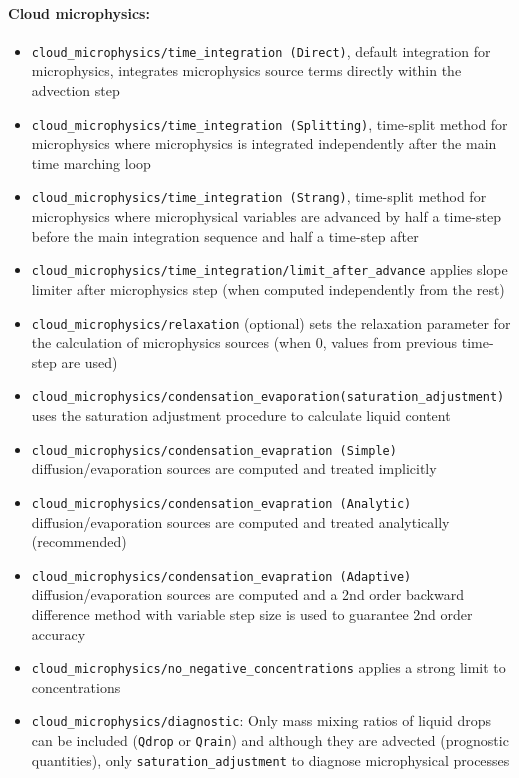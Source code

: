 \documentclass[10pt,a4paper]{article}
\begin{document}
\paragraph{Cloud microphysics:}
\begin{itemize}
\item \texttt{cloud\_microphysics/time\_integration (Direct)}, default integration for microphysics, integrates microphysics source terms directly within the advection step
\item \texttt{cloud\_microphysics/time\_integration (Splitting)}, time-split method for microphysics where microphysics is integrated independently after the main time marching loop
\item \texttt{cloud\_microphysics/time\_integration (Strang)}, time-split method for microphysics where microphysical variables are advanced by half a time-step before the main integration sequence and half a time-step after
\item \texttt{cloud\_microphysics/time\_integration/limit\_after\_advance} applies slope limiter after microphysics step (when computed independently from the rest)
\item \texttt{cloud\_microphysics/relaxation} (optional) sets the relaxation parameter for the calculation of microphysics sources (when 0, values from previous time-step are used)
\item \texttt{cloud\_microphysics/condensation\_evaporation(saturation\_adjustment)} uses the saturation adjustment procedure to calculate liquid content 
\item \texttt{cloud\_microphysics/condensation\_evapration (Simple)} diffusion/evaporation sources are computed and treated implicitly
\item \texttt{cloud\_microphysics/condensation\_evapration (Analytic)} diffusion/evaporation sources are computed and treated analytically (recommended)
\item \texttt{cloud\_microphysics/condensation\_evapration (Adaptive)} diffusion/evaporation sources are computed and a 2nd order backward difference method with variable step size is used to guarantee 2nd order accuracy
\item \texttt{cloud\_microphysics/no\_negative\_concentrations} applies a strong limit to concentrations
\item \texttt{cloud\_microphysics/diagnostic}: Only mass mixing ratios of liquid drops can be included (\texttt{Qdrop} or \texttt{Qrain}) and although they are advected (prognostic quantities), only \texttt{saturation\_adjustment} to diagnose microphysical processes

\end{itemize}
\end{document}
